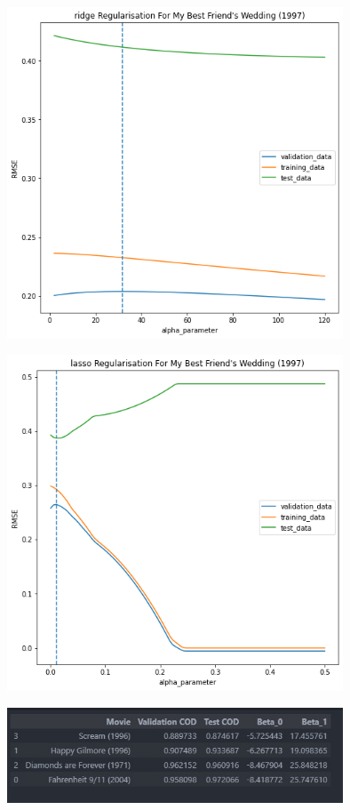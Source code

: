 \documentclass{article}
\begin{document}
\begin{figure}[t]
  \centering

  \includegraphics[width=10cm]{data anlysis project 2/fig_4.png}
 \caption{}
 \label{fig:1}
\end{figure}
\begin{figure}[t]
  \centering

  \includegraphics[width=10cm]{data anlysis project 2/fig_3.png}
 \caption{}
 \label{fig:1}
\end{figure}


\begin{figure}[t]
  \centering
  \includegraphics[width=10cm]{data anlysis project 2/question_5_1.jpg}
 \caption{}
 \label{fig:1}
\end{figure}
\end{document}
